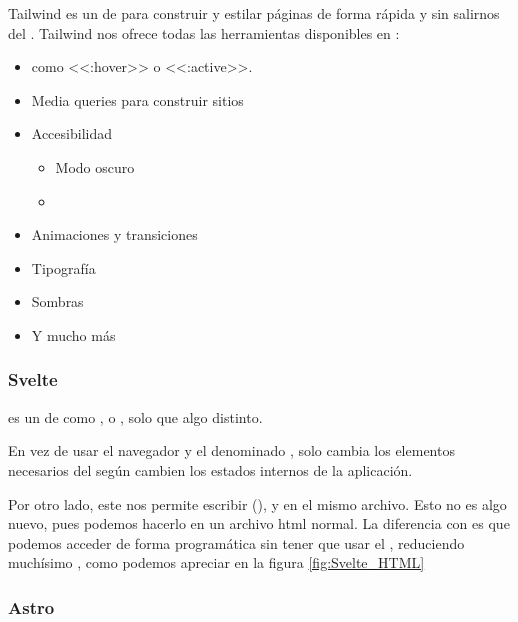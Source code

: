 Tailwind es un  de  para construir y estilar páginas de forma rápida y sin salirnos del . Tailwind nos ofrece todas las herramientas disponibles en :
\begin{itemize}
  \item {} como <<:hover>> o <<:active>>.
  \item Media queries para construir sitios 
  \item Accesibilidad
        \begin{itemize}
          \item Modo oscuro
          \item {}
        \end{itemize}
  \item Animaciones y transiciones
  \item Tipografía
  \item Sombras
  \item Y mucho más
\end{itemize}

\subsubsection{Svelte}

 es un  de  como ,  o , solo que algo distinto.

En vez de usar el navegador y el denominado  ,  solo cambia los elementos necesarios del  según cambien los estados internos de la aplicación.

Por otro lado, este  nos permite escribir  (),  y  en el mismo archivo. Esto no es algo nuevo, pues podemos hacerlo en un archivo html normal. La diferencia con  es que podemos acceder de forma programática sin tener que usar el , reduciendo muchísimo , como podemos apreciar en la figura \ref{fig:Svelte_HTML}


\subsubsection{Astro}


